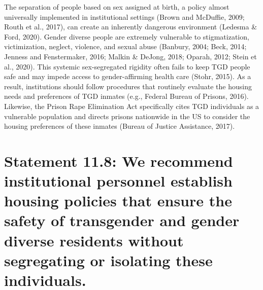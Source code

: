 \documentclass[
]{book}
\begin{document}
The separation of people based on sex assigned
at birth, a policy almost universally implemented
in institutional settings (Brown and McDuffie,
2009; Routh et al., 2017), can create an inherently
dangerous environment (Ledesma \& Ford, 2020).
Gender diverse people are extremely vulnerable to
stigmatization, victimization, neglect, violence, and
sexual abuse (Banbury, 2004; Beck, 2014; Jenness
and Fenstermaker, 2016; Malkin \& DeJong, 2018;
Oparah, 2012; Stein et al., 2020). This systemic
sex-segregated rigidity often fails to keep TGD
people safe and may impede access to
gender-affirming health care (Stohr, 2015). As a
result, institutions should follow procedures that
routinely evaluate the housing needs and preferences of TGD inmates (e.g., Federal Bureau of
Prisons, 2016). Likewise, the Prison Rape
Elimination Act specifically cites TGD individuals
as a vulnerable population and directs prisons
nationwide in the US to consider the housing preferences of these inmates (Bureau of Justice
Assistance, 2017).

\hypertarget{statement-11.8-we-recommend-institutional-personnel-establish-housing-policies-that-ensure-the-safety-of-transgender-and-gender-diverse-residents-without-segregating-or-isolating-these-individuals.}{%
\section*{Statement 11.8: We recommend institutional personnel establish housing policies that ensure the safety of transgender and gender diverse residents without segregating or isolating these individuals.}\label{statement-11.8-we-recommend-institutional-personnel-establish-housing-policies-that-ensure-the-safety-of-transgender-and-gender-diverse-residents-without-segregating-or-isolating-these-individuals.}}
\end{document}
